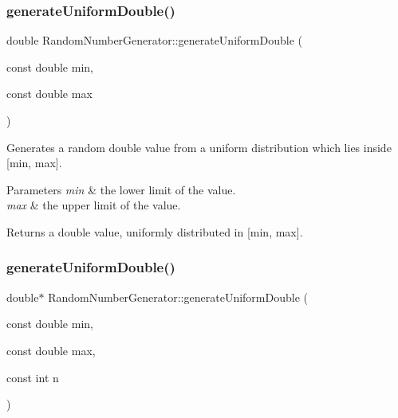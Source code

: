 \subsubsection{\texorpdfstring{generate\+Uniform\+Double()}{generateUniformDouble()}\hspace{0.1cm}{\footnotesize\ttfamily [1/2]}}
{\footnotesize\ttfamily double Random\+Number\+Generator\+::generate\+Uniform\+Double (\begin{DoxyParamCaption}\item[{const double}]{min,  }\item[{const double}]{max }\end{DoxyParamCaption})}

Generates a random double value from a uniform distribution which lies inside \mbox{[}min, max\mbox{]}. 
\begin{DoxyParams}{Parameters}
{\em min} & the lower limit of the value. \\
\hline
{\em max} & the upper limit of the value. \\
\hline
\end{DoxyParams}
\begin{DoxyReturn}{Returns}
a double value, uniformly distributed in \mbox{[}min, max\mbox{]}. 
\end{DoxyReturn}
\mbox{\label{class_random_number_generator_a208c3dcccf6aa6a62151a98d58264d08}} 
\subsubsection{\texorpdfstring{generate\+Uniform\+Double()}{generateUniformDouble()}\hspace{0.1cm}{\footnotesize\ttfamily [2/2]}}
{\footnotesize\ttfamily double$\ast$ Random\+Number\+Generator\+::generate\+Uniform\+Double (\begin{DoxyParamCaption}\item[{const double}]{min,  }\item[{const double}]{max,  }\item[{const int}]{n }\end{DoxyParamCaption})}


